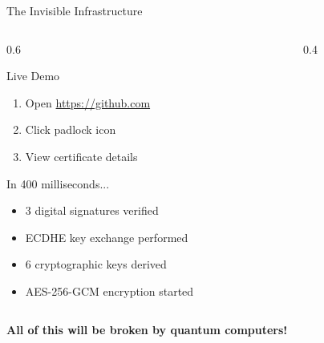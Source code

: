 \documentclass[aspectratio=169,10pt]{beamer}
\theoremstyle{plain}
\begin{document}
\begin{frame}{The Invisible Infrastructure}
   \begin{columns}
       \begin{column}{0.6\textwidth}
           \begin{block}{Live Demo}
               \begin{enumerate}
                   \item Open \url{https://github.com}
                   \item Click padlock icon
                   \item View certificate details
               \end{enumerate}
           \end{block}
           
           \vspace{0.5cm}
           
           \begin{alertblock}{In 400 milliseconds...}
               \begin{itemize}
                   \item 3 digital signatures verified
                   \item ECDHE key exchange performed
                   \item 6 cryptographic keys derived
                   \item AES-256-GCM encryption started
               \end{itemize}
           \end{alertblock}
       \end{column}
       
       \begin{column}{0.4\textwidth}
       \end{column}
   \end{columns}
   
   \vspace{0.5cm}
   \centering
   \textbf{\Large \color{qcred}All of this will be broken by quantum computers!}
\end{frame}
\end{document}
